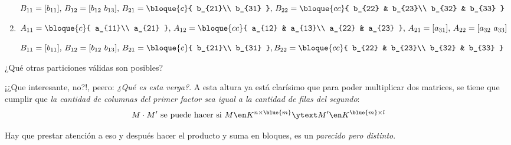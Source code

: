 \begin{enunciado}{\ejercicio}
\begin{enumerate}[label=(\alph*)]
          $B_{11} = [b_{11}],\,
            B_{12} = [b_{12}\ b_{13}],\,
            B_{21} =
            \bloque{c}{
              b_{21}\\
              b_{31}
            },\,
            B_{22} =
            \bloque{cc}{
              b_{22} & b_{23}\\
              b_{32} & b_{33}
            }
          $

    \item
          $A_{11} =
            \bloque{c}{
              a_{11}\\
              a_{21}
            },\,
            A_{12} =
            \bloque{cc}{
              a_{12} & a_{13}\\
              a_{22} & a_{23}
            },\,
            A_{21} = [a_{31}],\,
            A_{22} = [a_{32} \ a_{33}]
          $

          $B_{11} = [b_{11}],\,
            B_{12} = [b_{12}\ b_{13}],\,
            B_{21} =
            \bloque{c}{
              b_{21}\\
              b_{31}
            },
            B_{22} =
            \bloque{cc}{
              b_{22} & b_{23}\\
              b_{32} & b_{33}
            }
          $
  \end{enumerate}
  ¿Qué otras particiones válidas son posibles?
\end{enunciado}

¡¿Que interesante, no?!, peero: {\tiny\textit{¿Qué es esta verga?}}. A esta altura ya está clarísimo que para
poder multiplicar dos matrices, se tiene que cumplir que \textit{la cantidad de columnas del primer factor sea igual
  a la cantidad de filas del segundo}:
$$
  M \cdot M'
  \text{  se puede hacer si }
  M \en K^{n \times \blue{m}}
  \ytext
  M' \en K^{\blue{m} \times l}
$$

Hay que prestar atención a eso y después hacer el producto y suma en bloques, es un \textit{parecido pero distinto}.


